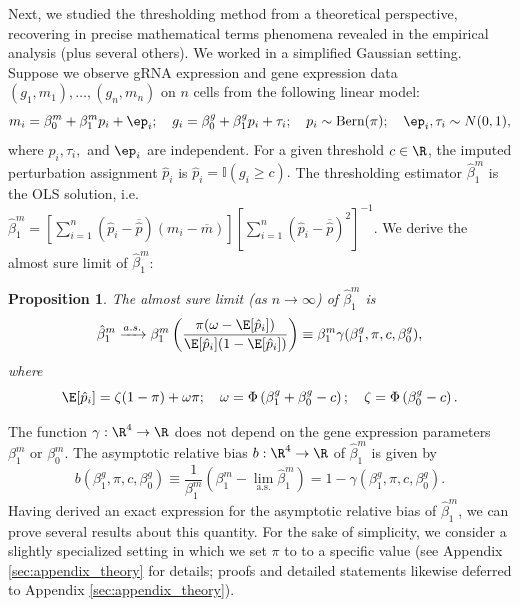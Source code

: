 \documentclass[11pt]{article}
\newtheorem{proposition}{Proposition}
\begin{document}
Next, we studied the thresholding method from a theoretical perspective, recovering in precise mathematical terms phenomena revealed in the empirical analysis (plus several others). We worked in a simplified Gaussian setting. Suppose we observe gRNA expression and gene expression data $(g_1, m_1), \dots, (g_n, m_n)$ on $n$ cells from the following linear model:
\begin{equation}\label{theoretical_model}
m_i = \beta^m_0 + \beta^m_1 p_i + \ep_i; \quad
g_i = \beta^g_0 + \beta^g_1 p_i + \tau_i; \quad
p_i \sim \textrm{Bern}(\pi); \quad
\ep_i, \tau_i \sim N(0,1),
\end{equation}
where $p_i, \tau_i,$ and $\ep_i$ are independent. For a given threshold $c \in \R$, the imputed perturbation assignment $\hat{p}_i$ is $\hat{p}_i = \mathbb{I}(g_i \geq c).$ The thresholding estimator $\hat{\beta}^m_1$ is the OLS solution, i.e. $\hat{\beta}^m_1 = \left[\sum_{i=1}^n (\hat{p}_i - \overline{\hat{p}})(m_i - \overline{m})\right]\left[\sum_{i=1}^n (\hat{p}_i - \overline{\hat{p}})^2\right]^{-1}.$ We derive the almost sure limit of $\hat{\beta}^m_1$: 
\begin{proposition}\label{prop:convergence}
	The almost sure limit (as $n \to \infty$) of $\hat{\beta}^m_1$ is
	\begin{equation}\label{thresh_est_intercepts}
	\hat{\beta}^m_1 \xrightarrow{a.s.} \beta^m_1 \left(\frac{ \pi( \omega - \E[ \hat{p}_i ])}{ \E[\hat{p}_i] (1 - \E[\hat{p}_i])}\right) \equiv \beta^m_1 \gamma(\beta^g_1, \pi, c, \beta^g_0), 
	\end{equation} where 
	$$
	\E[\hat{p}_i] = \zeta(1-\pi) + \omega\pi; \quad \omega = \Phi\left(\beta_1^g + \beta_0^g -c \right); \quad \zeta = \Phi\left( \beta^g_0 - c \right).$$
\end{proposition}
The function $\gamma: \R^4 \to \R$ does not depend on the gene expression parameters $\beta^m_1$ or $\beta^m_0$. The asymptotic relative bias $b: \R^4 \to \R$ of $\hat{\beta}^m_1$ is given by
$$b(\beta^g_1, \pi, c, \beta^g_0)  \equiv \frac{1}{\beta^m_1} \left(\beta^m_1 - \lim_\textrm{a.s.} \hat{\beta}^m_1 \right) = 1 - \gamma(\beta^g_1, \pi, c, \beta^g_0).$$
Having derived an exact expression for  the asymptotic relative bias of  $\hat{\beta}^m_1$, we can prove several results about this quantity. For the sake of simplicity, we consider a slightly specialized setting in which we set $\pi$ to to a specific value (see Appendix \ref{sec:appendix_theory} for details; proofs and detailed statements likewise deferred to Appendix \ref{sec:appendix_theory}).
\end{document}
